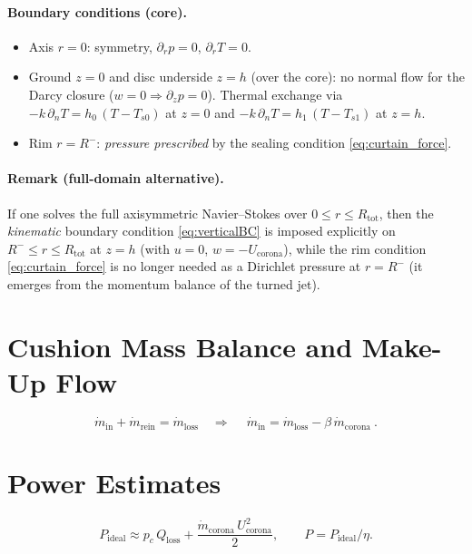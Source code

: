 \documentclass[11pt,a4paper]{article}
\begin{document}
\paragraph{Boundary conditions (core).}
\begin{itemize}
  \item Axis $r=0$: symmetry, $\partial_r p=0$, $\partial_r T=0$.
  \item Ground $z=0$ and disc underside $z=h$ (over the core): no normal flow for the Darcy closure ($w=0\Rightarrow \partial_z p=0$). Thermal exchange via
  $-k\,\partial_n T=h_0\,(T-T_{s0})$ at $z=0$ and $-k\,\partial_n T=h_1\,(T-T_{s1})$ at $z=h$.
  \item Rim $r=R^-$: \emph{pressure prescribed} by the sealing condition \eqref{eq:curtain_force}.
\end{itemize}

\paragraph{Remark (full-domain alternative).}
If one solves the full axisymmetric Navier--Stokes over $0\le r\le R_{\text{tot}}$, then the \emph{kinematic} boundary condition \eqref{eq:verticalBC} is imposed explicitly on $R^-\le r\le R_{\text{tot}}$ at $z=h$ (with $u=0$, $w=-U_{\mathrm{corona}}$), while the rim condition \eqref{eq:curtain_force} is no longer needed as a Dirichlet pressure at $r=R^-$ (it emerges from the momentum balance of the turned jet).

\section{Cushion Mass Balance and Make-Up Flow}
\begin{equation}
  \dot m_{\mathrm{in}} + \dot m_{\mathrm{rein}} = \dot m_{\mathrm{loss}}
  \quad\Rightarrow\quad
  \boxed{\ \dot m_{\mathrm{in}} = \dot m_{\mathrm{loss}} - \beta\,\dot m_{\mathrm{corona}}\ }.
  \label{eq:massbalance}
\end{equation}

\section{Power Estimates}
\begin{equation}
  P_{\mathrm{ideal}} \approx p_c\,Q_{\mathrm{loss}} + \frac{\dot m_{\mathrm{corona}}\,U_{\mathrm{corona}}^{2}}{2},
  \qquad P=P_{\mathrm{ideal}}/\eta.
  \label{eq:power}
\end{equation}
\end{document}
